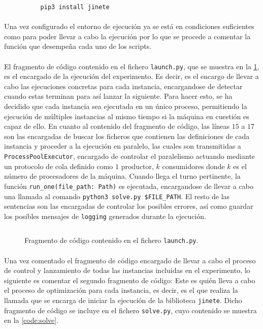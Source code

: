 \documentclass{subfiles}
\begin{document}
        \begin{verbatim}
          pip3 install jinete
        \end{verbatim}

        \paragraph{}
        Una vez configurado el entorno de ejecución ya se está en condiciones suficientes como para poder llevar a cabo la ejecución por lo que se procede a comentar la función que desempeña cada uno de los scripts.

        \paragraph{}
        El fragmento de código contenido en el fichero \texttt{launch.py}, que se muestra en la \cref{code:launch}, es el encargado de  la ejecución del experimento. Es decir, es el encargo de llevar a cabo las ejecuciones concretas para cada instancia, encargandose de detectar cuando estas terminan para así lanzar la siguiente. Para hacer esto, se ha decidido que cada instancia sea ejecutada en un único proceso, permitiendo la ejecución de múltiples instancias al mismo tiempo si la máquina en cuestión es capaz de ello. En cuanto al contenido del fragmento de código, las líneas $15$ a $17$ son las encargadas de buscar los ficheros que contienen las definiciones de cada instancia y proceder a la ejecución en paralelo, las cuales son transmitidas a \texttt{ProcessPoolExecutor}, encargado de controlar el paralelismo actuando mediante un protocolo de cola definido como $1$ productor, $k$ consumidores donde $k$ es el número de procesadores de la máquina. Cuando llega el turno pertinente, la función \verb|run_one(file_path: Path)| es ejecutada, encargandose de llevar a cabo una llamada al comando \verb|python3 solve.py $FILE_PATH|. El resto de las sentencias son las encargadas de controlar los posibles errores, así como guardar los posibles mensajes de \texttt{logging} generados durante la ejecución.

        \begin{figure}[!hb]
    			\centering
    			\inputminted[frame=single,framesep=10pt,linenos]{python}{./code/launch.py}
    			\caption{Fragmento de código contenido en el fichero \texttt{launch.py}.}
    			\label{code:launch}
    		\end{figure}

        \paragraph{}
        Una vez comentado el fragmento de código encargado de llevar a cabo el proceso de control y lanzamiento de todas las instancias incluidas en el experimento, lo siguiente es comentar el segundo fragmento de código: Este es quién lleva a cabo el proceso de optimización para cada instancia, es decir, es el que realiza la llamada que se encarga de iniciar la ejecución de la biblioteca \texttt{jinete}. Dicho fragmento de código se incluye en el fichero \texttt{solve.py}, cuyo contenido se muestra en la \cref{code:solve}.
\end{document}
